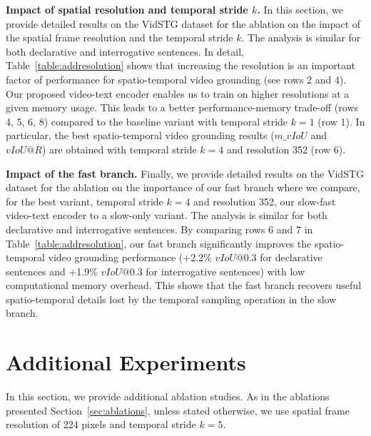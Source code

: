 \noindent \textbf{Impact of spatial resolution and temporal stride $k$.}\label{sec:addresolution} 
In this section, we provide detailed results on the VidSTG dataset for the ablation on the impact of the spatial frame resolution and the temporal stride $k$.
The analysis is similar for both declarative and interrogative sentences.
In detail, Table~\ref{table:addresolution} shows that increasing the resolution is an important factor of performance for spatio-temporal video grounding (see rows 2 and 4).
Our proposed video-text encoder enables us to train on higher resolutions at a given memory usage.
This leads to a better performance-memory trade-off (rows 4, 5, 6, 8) compared to the baseline variant with temporal stride $k=1$ (row 1).
In particular, the best spatio-temporal video grounding results ($m\_vIoU$ and $vIoU@R$) are obtained with temporal stride $k=4$ and resolution 352 (row 6).

\noindent \textbf{Impact of the fast branch.} 
Finally, we provide detailed results on the VidSTG dataset for the ablation on the importance of our fast branch where we compare, for the best variant, temporal stride $k=4$ and resolution 352, our slow-fast video-text encoder to a slow-only variant.
The analysis is similar for both declarative and interrogative sentences.
By comparing rows 6 and 7 in Table~\ref{table:addresolution}, our fast branch significantly improves the spatio-temporal video grounding performance (+2.2\% $vIoU@0.3$ for declarative sentences and +1.9\% $vIoU@0.3$ for interrogative sentences) with low computational memory overhead.
This shows that the fast branch recovers useful spatio-temporal details lost by the temporal sampling operation in the slow branch.

\section{Additional Experiments}\label{sec:addexp}
In this section, we provide additional ablation studies. As in the ablations presented Section~\ref{sec:ablations}, unless stated otherwise, we use spatial frame resolution of 224 pixels and temporal stride $k=5$.

